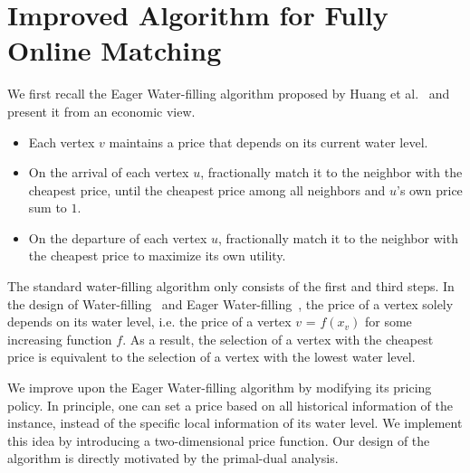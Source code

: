 \section{Improved Algorithm for Fully Online Matching}
\label{sec:fully_lower}

We first recall the Eager Water-filling algorithm proposed by Huang et al.~\cite{focs/HuangTWZ20} and present it from an economic view.
\begin{itemize}
	\item Each vertex $v$ maintains a price that depends on its current water level.
	\item On the arrival of each vertex $u$, fractionally match it to the neighbor with the cheapest price, until the cheapest price among all neighbors and $u$'s own price sum to $1$.
	\item On the departure of each vertex $u$, fractionally match it to the neighbor with the cheapest price to maximize its own utility.
\end{itemize}

The standard water-filling algorithm only consists of the first and third steps. In the design of Water-filling~\cite{soda/HuangPTTWZ19} and Eager Water-filling~\cite{focs/HuangTWZ20}, the price of a vertex solely depends on its water level, i.e. the price of a vertex $v$ = $f(x_v)$ for some increasing function $f$. As a result, the selection of a vertex with the cheapest price is equivalent to the selection of a vertex with the lowest water level.

We improve upon the Eager Water-filling algorithm by modifying its pricing policy.  
In principle, one can set a price based on all historical information of the instance, instead of the specific local information of its water level. We implement this idea by introducing a two-dimensional price function. Our design of the algorithm is directly motivated by the primal-dual analysis.

